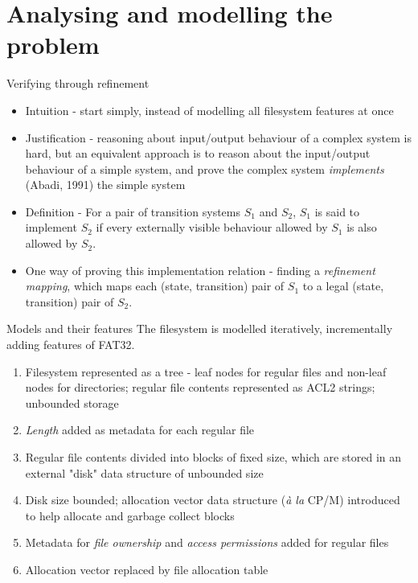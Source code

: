 \documentclass{beamer}
\begin{document}
\section{Analysing and modelling the problem}

\begin{frame}{Verifying through refinement}
  \begin{itemize}
  \item Intuition - start simply, instead of modelling all
    filesystem features at once
  \item Justification - reasoning about input/output behaviour of a
    complex system is hard, but an equivalent approach is to reason
    about the input/output behaviour of a simple system, and prove the
    complex system \textit{implements} (Abadi, 1991) the simple system
  \item Definition - For a pair of transition systems $S_1$ and $S_2$,
    $S_1$ is said to implement $S_2$ if every externally visible
    behaviour allowed by $S_1$ is also allowed by $S_2$.
  \item One way of proving this implementation relation - finding a
    \textit{refinement mapping}, which maps each
    (state, transition) pair of $S_1$ to a legal (state, transition)
    pair of $S_2$.
  \end{itemize}
\end{frame}

\begin{frame}{Models and their features}
  The filesystem is modelled iteratively, incrementally
    adding features of FAT32.
  \begin{enumerate}
  \item Filesystem represented as a tree - leaf
    nodes for regular files and non-leaf nodes for
    directories; regular file contents represented as ACL2
    strings; unbounded storage
  \item \textit{Length} added as metadata for each regular file
  \item Regular file contents divided into
    blocks of fixed size, which are stored in an external
    "disk" data structure of unbounded size
  \item Disk size bounded; allocation vector data structure
    (\textit{\`{a} la} CP/M) introduced to help allocate and garbage
    collect blocks
  \item Metadata for \textit{file ownership} and \textit{access
    permissions} added for regular files
  \item Allocation vector replaced by file allocation table
  \end{enumerate}
\end{frame}
\end{document}

